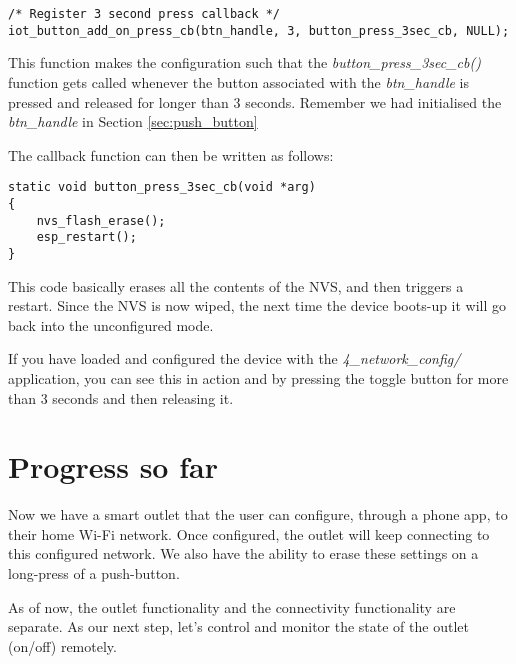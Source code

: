 \documentclass[main.tex]{subfiles}
\begin{document}
\begin{verbatim}
/* Register 3 second press callback */
iot_button_add_on_press_cb(btn_handle, 3, button_press_3sec_cb, NULL);
\end{verbatim}

This function makes the configuration such that the \textit{button\_press\_3sec\_cb()} function gets called whenever the button associated with the \textit{btn\_handle} is pressed and released for longer than 3 seconds. Remember we had initialised the \textit{btn\_handle} in Section \ref{sec:push_button}

The callback function can then be written as follows:
\begin{verbatim}
static void button_press_3sec_cb(void *arg)
{
    nvs_flash_erase();
    esp_restart();
}
\end{verbatim}

This code basically erases all the contents of the NVS, and then triggers a restart. Since the NVS is now wiped, the next time the device boots-up it will go back into the unconfigured mode. 

If you have loaded and configured the device with the \textit{4\_network\_config/} application, you can see this in action and by pressing the toggle button for more than 3 seconds and then releasing it.

\section{Progress so far}
Now we have a smart outlet that the user can configure, through a phone app, to their home Wi-Fi network. Once configured, the outlet will keep connecting to this configured network. We also have the ability to erase these settings on a long-press of a push-button.

As of now, the outlet functionality and the connectivity functionality are separate. As our next step, let's control and monitor the state of the outlet (on/off) remotely.
\end{document}
